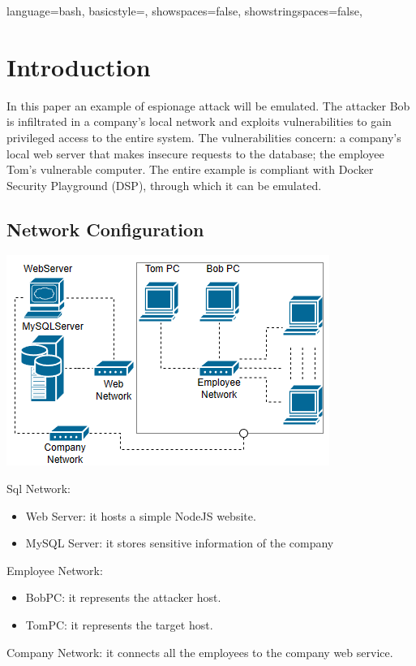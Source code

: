 \documentclass[a4paper, 12pt, oneside]{extbook}
\begin{document}

\frontmatter

{
\tableofcontents
}

{
  language=bash,
  basicstyle=\color{black},
  showspaces=false,
  showstringspaces=false,
}
\linespread{1}
\onehalfspacing

\mainmatter




\chapter{Introduction}
In this paper an example of espionage attack will be emulated. 
The attacker Bob is infiltrated in a company's local network and exploits vulnerabilities to gain privileged access to the entire system.
The vulnerabilities concern: a company's local web server that makes insecure requests to the database; the employee Tom's vulnerable computer.
The entire example is compliant with Docker Security Playground (DSP), through which it can be emulated.
\section{Network Configuration}
\begin{center}
\includegraphics[scale=1]{../Image/network.PNG}
\end{center}
Sql Network: 
\begin{itemize}
  \item Web Server: it hosts a simple NodeJS website.
  \item MySQL Server: it stores sensitive information of the company
\end{itemize} 
Employee Network: 
\begin{itemize}
  \item BobPC: it represents the attacker host.
  \item TomPC: it represents the target host.
\end{itemize} 
Company Network: it connects all the employees to the company web service.
\end{document}
